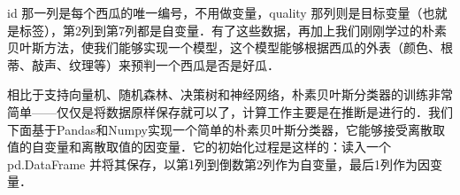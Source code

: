 \documentclass{ctexart}
\begin{document}
    id 那一列是每个西瓜的唯一编号，不用做变量，quality 那列则是目标变量（也就是标签），第2列到第7列都是自变量．有了这些数据，再加上我们刚刚学过的朴素贝叶斯方法，使我们能够实现一个模型，这个模型能够根据西瓜的外表（颜色、根蒂、敲声、纹理等）来预判一个西瓜是否是好瓜．

    相比于支持向量机、随机森林、决策树和神经网络，朴素贝叶斯分类器的训练非常简单——仅仅是将数据原样保存就可以了，计算工作主要是在推断是进行的．我们下面基于Pandas和Numpy实现一个简单的朴素贝叶斯分类器，它能够接受离散取值的自变量和离散取值的因变量．它的初始化过程是这样的：读入一个 pd.DataFrame 并将其保存，以第1列到倒数第2列作为自变量，最后1列作为因变量．

    
\end{document}
